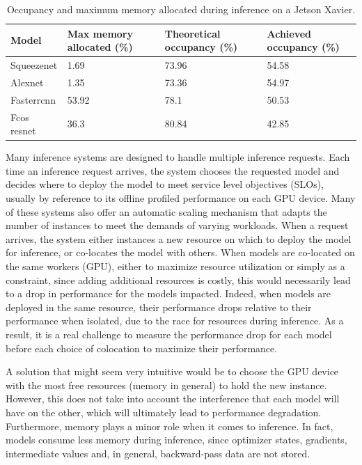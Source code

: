 \begin{table}
	\centering
	\begin{tabular}{p{}p{}p{}p{}}
		\toprule
		\textbf{Model} & \textbf{Max memory allocated (\%)} & \textbf{Theoretical occupancy (\%)} & \textbf{Achieved occupancy (\%)} \\
		\midrule
		Squeezenet     & 1.69                               & 73.96                               & 54.58                            \\
		Alexnet        & 1.35                               & 73.36                               & 54.97                            \\
		Fasterrcnn     & 53.92                              & 78.1                                & 50.53                            \\
		Fcos resnet    & 36.3                               & 80.84                               & 42.85                            \\
		\bottomrule
	\end{tabular}
	\caption{Occupancy and maximum memory allocated during inference on a Jetson Xavier.}
\end{table}


Many inference systems are designed to handle multiple inference requests. Each time an inference request arrives, the system chooses the requested model and decides where to deploy the model to meet service level objectives (SLOs), usually by reference to its offline profiled performance on each GPU device. Many of these systems also offer an automatic scaling mechanism that adapts the number of instances to meet the demands of varying workloads. When a request arrives, the system either instances a new resource on which to deploy the model for inference, or co-locates the model with others. When models are co-located on the same workers (GPU), either to maximize resource utilization or simply as a constraint, since adding additional resources is costly, this would necessarily lead to a drop in performance for the models impacted. Indeed, when models are deployed in the same resource, their performance drops relative to their performance when isolated, due to the race for resources during inference. As a result, it is a real challenge to measure the performance drop for each model before each choice of colocation to maximize their performance.

A solution that might seem very intuitive would be to choose the GPU device with the most free resources (memory in general) to hold the new instance. However, this does not take into account the interference that each model will have on the other, which will ultimately lead to performance degradation. Furthermore, memory plays a minor role when it comes to inference. In fact, models consume less memory during inference, since optimizer states, gradients, intermediate values and, in general, backward-pass data are not stored.

